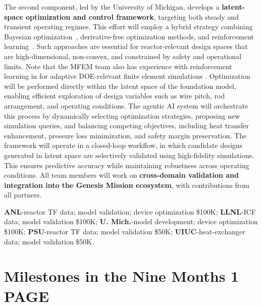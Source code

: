 The second component, led by the University of Michigan, develops a {\bf
latent-space optimization and control framework}, targeting both steady and
transient operating regimes.  This effort will employ a hybrid strategy
combining {\rm Bayesian optimization}~\cite{Morita2022BOCFD}, {\rm
derivative-free optimization methods}, and {\rm reinforcement
learning}~\cite{Font2025DRLFlowControl}.  Such approaches are essential for
reactor-relevant design spaces that are high-dimensional, non-convex, and
constrained by safety and operational limits. Note that the MFEM team also
has experience with reinforcement learning in for adaptive DOE-relevant
finite element simulations \cite{RL23}.
%
Optimization will be performed directly within the latent space of the
foundation model, enabling efficient exploration of design variables such as
wire pitch, rod arrangement, and operating conditions. The {\rm agentic AI
system} will orchestrate this process by dynamically selecting optimization
strategies, proposing new simulation queries, and balancing competing
objectives, including heat transfer enhancement, pressure loss minimization,
and safety margin preservation.
%
The framework will operate in a closed-loop workflow, in which candidate
designs generated in latent space are selectively validated using high-fidelity
simulations.  This ensures predictive accuracy while maintaining robustness
across operating conditions.
%
All team members will work on {\bf cross-domain validation and integration into the
Genesis Mission ecosystem}, with contributions from all partners.



\vspace*{.1in}
   {\bf ANL}-reactor TF data; model validation; device optimization \$100K;
   {\bf LLNL}-ICF data; model validation \$100K;
   {\bf U. Mich.}-model development; device optimization \$100K;
   {\bf PSU}-reactor TF data; model validation \$50K;
   {\bf UIUC}-heat-exchanger data; model validation \$50K.


\section{  Milestones in the Nine Months \hspace{1.0in} 1 PAGE}


